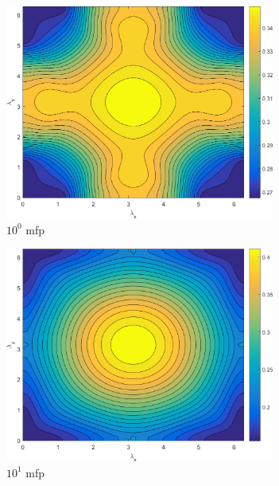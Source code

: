 \begin{figure}
	{
	\begin{subfigure}[b]{0.485\textwidth}
		\centering
		\includegraphics[width=0.975\textwidth]{figures/sec_DSA/SI_MIP_C=4_UPWLD1_LS8_x=1_dydx=1_contour.png}
		\caption{$10^{0}$ mfp}
	\end{subfigure}
	\hfill
	\begin{subfigure}[b]{0.485\textwidth}
		\centering
		\includegraphics[width=0.975\textwidth]{figures/sec_DSA/SI_MIP_C=4_UPWLD1_LS8_x=10_dydx=1_contour.png}
		\caption{$10^{1}$ mfp}
	\end{subfigure}
	}
	\vspace{0.5cm}
	{
	\begin{subfigure}[b]{0.485\textwidth}

\end{subfigure}}
\end{figure}
